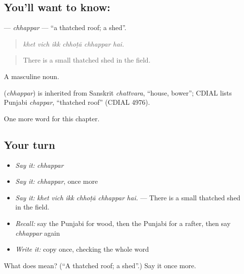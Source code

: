 \subsection*{You'll want to know: }
\textbf{} — \emph{chhappar} — \textquotedblleft{}a thatched roof; a shed\textquotedblright{}.

\begin{quote}
     
\end{quote}

\begin{quote}
\emph{khet vich ikk chhoṭā chhappar hai.}
\end{quote}

\begin{quote}
There is a small thatched shed in the field.
\end{quote}

A masculine noun.

\begin{cousinweb}
\textbf{} (\emph{chhappar}) is inherited from Sanskrit \emph{chattvara}, \textquotedblleft{}house, bower\textquotedblright{}; CDIAL lists Punjabi \emph{chappar}, \textquotedblleft{}thatched roof\textquotedblright{} (CDIAL 4976).
\end{cousinweb}

\begin{grammarlens}[title={What you've built}]
One more word for this chapter.
\end{grammarlens}

\subsection*{Your turn}
\begin{itemize}
\raggedright
  \item \emph{Say it:} \emph{chhappar}
  \item \emph{Say it:} \emph{chhappar}, once more
  \item \emph{Say it:} \emph{khet vich ikk chhoṭā chhappar hai.} — There is a small thatched shed in the field.
  \item \emph{Recall:} say the Punjabi for wood, then the Punjabi for a rafter, then say \emph{chhappar} again
  \item \emph{Write it:} copy \textbf{} once, checking the whole word
\end{itemize}

\begin{tcolorbox}[breakable,colback=teal!4,colframe=teal!35!black,title={Before you move on}]
What does  mean? (\textquotedblleft{}A thatched roof; a shed\textquotedblright{}.) Say it once more.
\end{tcolorbox}
